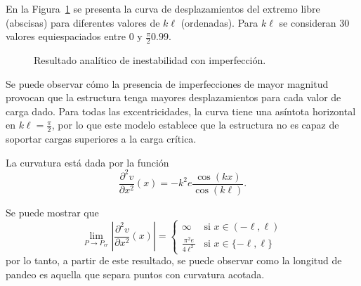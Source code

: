 En la Figura~\ref{fig:ejpand} se presenta la curva de desplazamientos del extremo libre (abscisas) para diferentes valores de $k\ell$ (ordenadas). %
%
Para $k\ell$ se consideran 30 valores equiespaciados entre $0$ y $\frac{\pi}{2} 0.99$.

\begin{figure}[htb]
	\centering
		\resizebox{.7\textwidth}{!}{}
	\caption{Resultado analítico de inestabilidad con imperfección.}
	\label{fig:ejpand}
\end{figure}

Se puede observar cómo la presencia de imperfecciones de mayor magnitud provocan que la estructura tenga mayores desplazamientos para cada valor de carga dado. %
%
Para todas las excentricidades, la curva tiene una asíntota horizontal en $k\ell=\frac{\pi}{2}$, por lo que este modelo establece que la estructura no es capaz de soportar cargas superiores a la carga crítica.


La curvatura está dada por la función 
\begin{equation}
\frac{\partial^2 v}{\partial x^2}(x) = -k^2 e \frac{\cos(k x)}{\cos(k\ell)}.
\end{equation}


Se puede mostrar que
\begin{equation}
\lim\limits_{P\rightarrow P_{cr}}
\left| \frac{\partial^2 v}{\partial x^2}(x) \right|
 =
\left\{
\begin{array}{lr}
\infty & \text{si } x \in (-\ell,\ell)\\
\displaystyle \frac{\pi^2 e}{4 \ell^2} & \text{si } x \in \{-\ell,\ell\}
\end{array}
\right.
\end{equation}
%
por lo tanto, a partir de este resultado, se puede observar como la longitud de pandeo es aquella que separa puntos con curvatura acotada.





